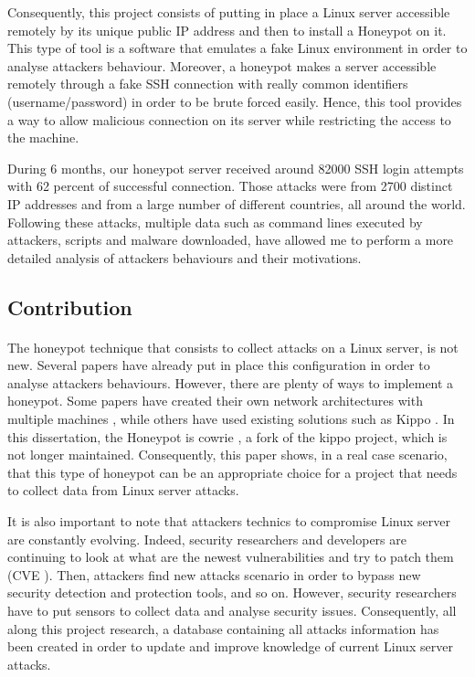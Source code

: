 Consequently, this project consists of putting in place a Linux server accessible remotely 
by its unique public IP address and then to install a Honeypot on it. This type of tool is
a software that emulates a fake Linux environment in order to analyse attackers behaviour.
Moreover, a honeypot makes a server accessible remotely through a fake SSH connection with
 really common identifiers (username/password) in order to be brute forced easily.
Hence, this tool provides a way to allow malicious connection on its server while restricting
the access to the machine.

During 6 months, our honeypot server received around 82000 SSH login attempts with 62 percent 
of successful connection. Those attacks were from 2700 distinct IP addresses and from a large
number of different countries, all around the world. Following these attacks, multiple data 
such as command lines executed by attackers, scripts and malware downloaded, have allowed 
me to perform a more detailed analysis of attackers behaviours and their motivations.
 
\subsection{Contribution} %

\paragraph{}

The honeypot technique that consists to collect attacks on a Linux server, is not new. Several papers have
already put in place this configuration in order to analyse attackers behaviours. However, 
there are plenty of ways to implement a honeypot. Some papers have created their own network
 architectures with multiple machines \cite{paperOwnHoneypot}, while others have used existing solutions such as Kippo \cite{paperWithKippo}.
In this dissertation, the Honeypot is cowrie \cite{cowrie}, a fork of the kippo project, which is not longer
maintained. Consequently, this paper shows, in a real case scenario, that this type of honeypot can be
 an appropriate choice for a project that needs to collect data from Linux server attacks.
 
It is also important to note that attackers technics to compromise Linux server are constantly 
evolving. Indeed, security researchers and developers are continuing to look at what are the 
newest vulnerabilities and try to patch them (CVE \cite{cve}). Then, attackers find new attacks scenario
in order to bypass new security detection and protection tools, and so on.
However, security researchers have to put sensors to collect data and analyse security
issues. Consequently, all along this project research, a database containing all attacks information
has been created in order to update and improve knowledge of current Linux server attacks.

